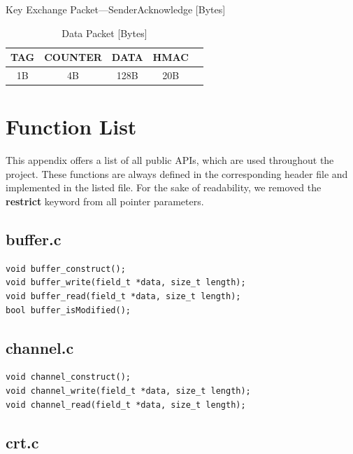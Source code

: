 \documentclass[a4paper]{article}
\begin{document}
\begin{appendices}
\begin{table}[h!]
    \caption{Key Exchange Packet---SenderAcknowledge [Bytes]}
    \label{tab:key_exchange_packet_senderacknowledge}
\end{table}
\begin{table}[h!]
    \begin{center}
        \begin{tabular}{| c | c | c | c | c |}
            \hline
            TAG & COUNTER & DATA & HMAC \\ \hline
            1B & 4B & 128B & 20B \\
            \hline
        \end{tabular}
    \end{center}
    
    \caption{Data Packet [Bytes]}
    \label{tab:data_packet}
\end{table}

\newpage

\section{Function List}

This appendix offers a list of all public APIs, which are used throughout the project. These functions are always defined in the corresponding header file and implemented in the listed file. For the sake of readability, we removed the \textbf{restrict} keyword from all pointer parameters.

\subsection{buffer.c}

\begin{lstlisting}[numbers=none, xleftmargin=0pt]
void buffer_construct();
void buffer_write(field_t *data, size_t length);
void buffer_read(field_t *data, size_t length);
bool buffer_isModified();
\end{lstlisting}

\subsection{channel.c}

\begin{lstlisting}[numbers=none, xleftmargin=0pt]
void channel_construct();
void channel_write(field_t *data, size_t length);
void channel_read(field_t *data, size_t length);
\end{lstlisting}

\subsection{crt.c}


\end{appendices}
\end{document}
